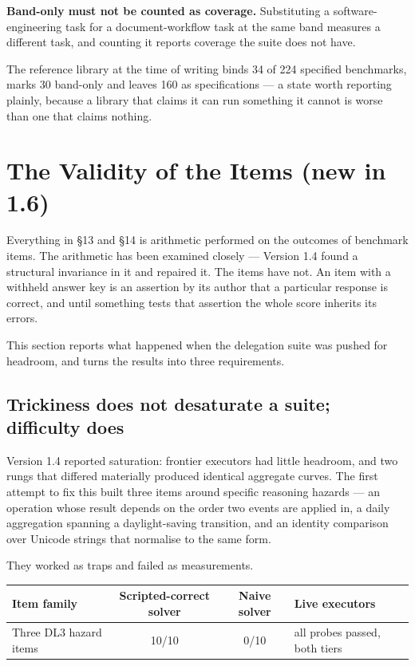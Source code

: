 \documentclass[11pt]{article}
\theoremstyle{definition}
\begin{document}
\textbf{Band-only must not be counted as coverage.} Substituting a software-engineering task for a document-workflow task at the same band measures a different task, and counting it reports coverage the suite does not have.

The reference library at the time of writing binds 34 of 224 specified benchmarks, marks 30 band-only and leaves 160 as specifications --- a state worth reporting plainly, because a library that claims it can run something it cannot is worse than one that claims nothing.

\section{The Validity of the Items (new in 1.6)}\label{sec:validity}

Everything in \S13 and \S14 is arithmetic performed on the outcomes of benchmark items. The arithmetic has been examined closely --- Version 1.4 found a structural invariance in it and repaired it. The items have not. An item with a withheld answer key is an assertion by its author that a particular response is correct, and until something tests that assertion the whole score inherits its errors.

This section reports what happened when the delegation suite was pushed for headroom, and turns the results into three requirements.

\subsection{Trickiness does not desaturate a suite; difficulty does}\label{sec:trickiness}

Version 1.4 reported saturation: frontier executors had little headroom, and two rungs that differed materially produced identical aggregate curves. The first attempt to fix this built three items around specific reasoning hazards --- an operation whose result depends on the order two events are applied in, a daily aggregation spanning a daylight-saving transition, and an identity comparison over Unicode strings that normalise to the same form.

They worked as traps and failed as measurements.

\begin{table}[h]
\centering\small
\begin{tabularx}{\textwidth}{@{}lccY@{}}
\toprule
Item family & Scripted-correct solver & Naive solver & Live executors \\
\midrule
Three DL3 hazard items & 10/10 & 0/10 & all probes passed, both tiers \\
\bottomrule
\end{tabularx}
\end{table}
\end{document}
